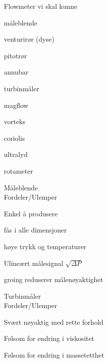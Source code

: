 \documentclass[avery5388,grid,frame]{flashcards}
\begin{document}

\begin{flashcard}{Flowmeter vi skal kunne}
	\begin{multicols}{2}
		\begin{description}
			\item måleblende
			\item venturirør (dyse)
			\item pitotrør
			\item annubar
			\item turbinmåler 
			\item magflow
			\item vorteks
			\item coriolis 
			\item ultralyd 
			\item rotameter
		\columnbreak
		\end{description}
	\end{multicols}
\end{flashcard}

\begin{flashcard}{Måleblende\\Fordeler/Ulemper}
	\begin{multicols}{2}
		\begin{description}
			\item [Fordeler]
			\item Enkel å produsere
			\item fås i alle dimensjoner
			\item høye trykk og temperaturer
		\columnbreak
			\item [Ulemper]
			\item  Ulineært målesignal $\sqrt{\Delta P}$ 
			\item  groing reduserer målenøyaktighet 
		\end{description}
	\end{multicols}
\end{flashcard}

\begin{flashcard}{Turbinmåler\\Fordeler/Ulemper}
	\begin{multicols}{2}
		\begin{description}
			\item [Fordeler]
			\item Svært nøyaktig med rette forhold
		\columnbreak
			\item [Ulemper]
			\item Følsom for endring i viskositet
			\item Følsom for endring i massetetthet
		\end{description}
	\end{multicols}
\end{flashcard}
\end{document}
